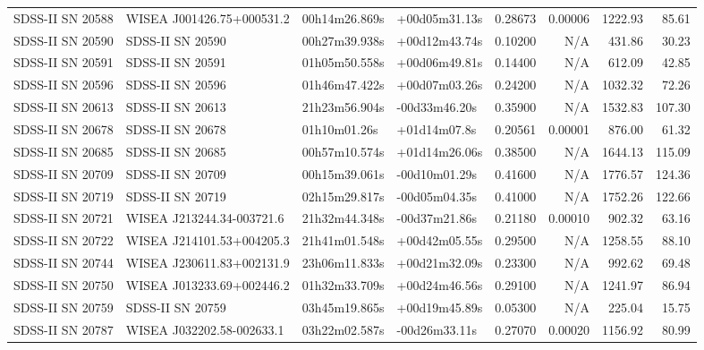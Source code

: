 \begin{longtable}{llllrrrr}
SDSS-II SN 20588 &       WISEA J001426.75+000531.2 &   00h14m26.869s &   +00d05m31.13s &  0.28673 &  0.00006 &  1222.93 &       85.61 \\
SDSS-II SN 20590 &                SDSS-II SN 20590 &   00h27m39.938s &   +00d12m43.74s &  0.10200 &      N/A &   431.86 &       30.23 \\
SDSS-II SN 20591 &                SDSS-II SN 20591 &   01h05m50.558s &   +00d06m49.81s &  0.14400 &      N/A &   612.09 &       42.85 \\
SDSS-II SN 20596 &                SDSS-II SN 20596 &   01h46m47.422s &   +00d07m03.26s &  0.24200 &      N/A &  1032.32 &       72.26 \\
SDSS-II SN 20613 &                SDSS-II SN 20613 &   21h23m56.904s &   -00d33m46.20s &  0.35900 &      N/A &  1532.83 &      107.30 \\
SDSS-II SN 20678 &                SDSS-II SN 20678 &    01h10m01.26s &    +01d14m07.8s &  0.20561 &  0.00001 &   876.00 &       61.32 \\
SDSS-II SN 20685 &                SDSS-II SN 20685 &   00h57m10.574s &   +01d14m26.06s &  0.38500 &      N/A &  1644.13 &      115.09 \\
SDSS-II SN 20709 &                SDSS-II SN 20709 &   00h15m39.061s &   -00d10m01.29s &  0.41600 &      N/A &  1776.57 &      124.36 \\
SDSS-II SN 20719 &                SDSS-II SN 20719 &   02h15m29.817s &   -00d05m04.35s &  0.41000 &      N/A &  1752.26 &      122.66 \\
SDSS-II SN 20721 &       WISEA J213244.34-003721.6 &   21h32m44.348s &   -00d37m21.86s &  0.21180 &  0.00010 &   902.32 &       63.16 \\
SDSS-II SN 20722 &       WISEA J214101.53+004205.3 &   21h41m01.548s &   +00d42m05.55s &  0.29500 &      N/A &  1258.55 &       88.10 \\
SDSS-II SN 20744 &       WISEA J230611.83+002131.9 &   23h06m11.833s &   +00d21m32.09s &  0.23300 &      N/A &   992.62 &       69.48 \\
SDSS-II SN 20750 &       WISEA J013233.69+002446.2 &   01h32m33.709s &   +00d24m46.56s &  0.29100 &      N/A &  1241.97 &       86.94 \\
SDSS-II SN 20759 &                SDSS-II SN 20759 &   03h45m19.865s &   +00d19m45.89s &  0.05300 &      N/A &   225.04 &       15.75 \\
SDSS-II SN 20787 &       WISEA J032202.58-002633.1 &   03h22m02.587s &   -00d26m33.11s &  0.27070 &  0.00020 &  1156.92 &       80.99 \\

\end{longtable}
